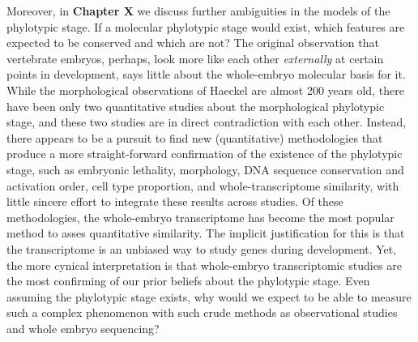 Moreover, in \textbf{Chapter X} we discuss further ambiguities in the models of the phylotypic stage. If a molecular phylotypic stage would exist, which features are expected to be conserved and which are not? The original observation that vertebrate embryos, perhaps, look more like each other \textit{externally} at certain points in development, says little about the whole-embryo molecular basis for it. While the morphological observations of Haeckel are almost 200 years old, there have been only two quantitative studies about the morphological phylotypic stage, and these two studies are in direct contradiction with each other. Instead, there appears to be a pursuit to find new (quantitative) methodologies that produce a more straight-forward confirmation of the existence of the phylotypic stage, such as embryonic lethality\cite{Uchida2018}, morphology\cite{OlafRP2003,Cordero2020}, DNA sequence conservation\cite{Piasecka2013,Quint2012,Liu2021} and activation order\cite{Uesaka2019}, cell type proportion\cite{Mayshar2023}, and whole-transcriptome similarity\cite{Piasecka2013,Irie2011,marletaz2018,Liu2020,Leong2021,PerezPosada2022,Kalinka2010}, with little sincere effort to integrate these results across studies. Of these methodologies, the whole-embryo transcriptome has become the most popular method to asses quantitative similarity. The implicit justification for this is that the transcriptome is an unbiased way to study genes during development. Yet, the more cynical interpretation is that whole-embryo transcriptomic studies are the most confirming of our prior beliefs about the phylotypic stage. Even assuming the phylotypic stage exists, why would we expect to be able to measure such a complex phenomenon with such crude methods as observational studies and whole embryo sequencing? 

